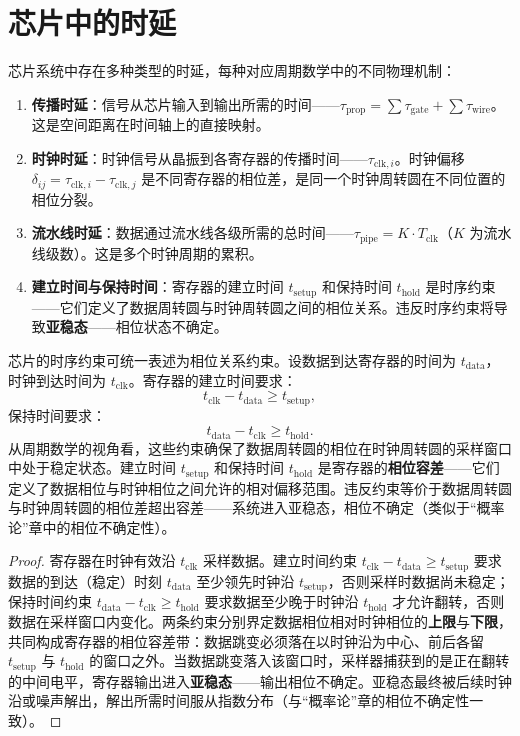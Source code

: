 \section{芯片中的时延}

\begin{definition}[芯片时延的类型]\label{def:chip_delay_types}
芯片系统中存在多种类型的时延，每种对应周期数学中的不同物理机制：
\begin{enumerate}[label=(\roman*)]
    \item \textbf{传播时延}：信号从芯片输入到输出所需的时间——$\tau_{\text{prop}} = \sum \tau_{\text{gate}} + \sum \tau_{\text{wire}}$。这是空间距离在时间轴上的直接映射。
    \item \textbf{时钟时延}：时钟信号从晶振到各寄存器的传播时间——$\tau_{\text{clk},i}$。时钟偏移 $\delta_{ij} = \tau_{\text{clk},i} - \tau_{\text{clk},j}$ 是不同寄存器的相位差，是同一个时钟周转圆在不同位置的相位分裂。
    \item \textbf{流水线时延}：数据通过流水线各级所需的总时间——$\tau_{\text{pipe}} = K \cdot T_{\text{clk}}$（$K$ 为流水线级数）。这是多个时钟周期的累积。
    \item \textbf{建立时间与保持时间}：寄存器的建立时间 $t_{\text{setup}}$ 和保持时间 $t_{\text{hold}}$ 是时序约束——它们定义了数据周转圆与时钟周转圆之间的相位关系。违反时序约束将导致\textbf{亚稳态}——相位状态不确定。
\end{enumerate}
\end{definition}

\begin{proposition}[芯片时序约束的周期数学表述]\label{prop:chip_timing_constraints}
芯片的时序约束可统一表述为相位关系约束。设数据到达寄存器的时间为 $t_{\text{data}}$，时钟到达时间为 $t_{\text{clk}}$。寄存器的建立时间要求：
\[
t_{\text{clk}} - t_{\text{data}} \ge t_{\text{setup}},
\]
保持时间要求：
\[
t_{\text{data}} - t_{\text{clk}} \ge t_{\text{hold}}.
\]
从周期数学的视角看，这些约束确保了数据周转圆的相位在时钟周转圆的采样窗口中处于稳定状态。建立时间 $t_{\text{setup}}$ 和保持时间 $t_{\text{hold}}$ 是寄存器的\textbf{相位容差}——它们定义了数据相位与时钟相位之间允许的相对偏移范围。违反约束等价于数据周转圆与时钟周转圆的相位差超出容差——系统进入亚稳态，相位不确定（类似于“概率论”章中的相位不确定性）。
\end{proposition}

\begin{proof}
寄存器在时钟有效沿 $t_{\text{clk}}$ 采样数据。建立时间约束 $t_{\text{clk}} - t_{\text{data}} \ge t_{\text{setup}}$ 要求数据的到达（稳定）时刻 $t_{\text{data}}$ 至少领先时钟沿 $t_{\text{setup}}$，否则采样时数据尚未稳定；保持时间约束 $t_{\text{data}} - t_{\text{clk}} \ge t_{\text{hold}}$ 要求数据至少晚于时钟沿 $t_{\text{hold}}$ 才允许翻转，否则数据在采样窗口内变化。两条约束分别界定数据相位相对时钟相位的\textbf{上限}与\textbf{下限}，共同构成寄存器的相位容差带：数据跳变必须落在以时钟沿为中心、前后各留 $t_{\text{setup}}$ 与 $t_{\text{hold}}$ 的窗口之外。当数据跳变落入该窗口时，采样器捕获到的是正在翻转的中间电平，寄存器输出进入\textbf{亚稳态}——输出相位不确定。亚稳态最终被后续时钟沿或噪声解出，解出所需时间服从指数分布（与“概率论”章的相位不确定性一致）。
\end{proof}

